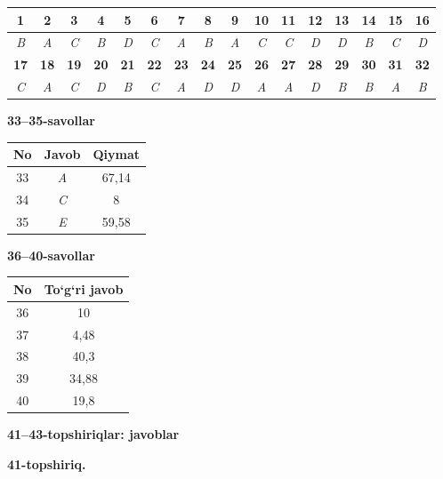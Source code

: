 \documentclass[11pt,a4paper]{article}
\begin{document}
\noindent\begin{tabular}{|c|c|c|c|c|c|c|c|c|c|c|c|c|c|c|c|}\hline
\textbf{1} & \textbf{2} & \textbf{3} & \textbf{4} & \textbf{5} & \textbf{6} & \textbf{7} & \textbf{8} & \textbf{9} & \textbf{10} & \textbf{11} & \textbf{12} & \textbf{13} & \textbf{14} & \textbf{15} & \textbf{16}\\\hline
\textsl{B} & \textsl{A} & \textsl{C} & \textsl{B} & \textsl{D} & \textsl{C} & \textsl{A} & \textsl{B} & \textsl{A} & \textsl{C} & \textsl{C} & \textsl{D} & \textsl{D} & \textsl{B} & \textsl{C} & \textsl{D}\\\hline
\textbf{17} & \textbf{18} & \textbf{19} & \textbf{20} & \textbf{21} & \textbf{22} & \textbf{23} & \textbf{24} & \textbf{25} & \textbf{26} & \textbf{27} & \textbf{28} & \textbf{29} & \textbf{30} & \textbf{31} & \textbf{32}\\\hline
\textsl{C} & \textsl{A} & \textsl{C} & \textsl{D} & \textsl{B} & \textsl{C} & \textsl{A} & \textsl{D} & \textsl{D} & \textsl{A} & \textsl{A} & \textsl{D} & \textsl{B} & \textsl{B} & \textsl{A} & \textsl{B}\\\hline
\end{tabular}\par\medskip
\noindent\textbf{33--35-savollar}\par\smallskip
\noindent\begin{tabular}{|c|c|c|}\hline \textbf{No} & \textbf{Javob} & \textbf{Qiymat}\\\hline
33 & \textsl{A} & 67,14\\\hline
34 & \textsl{C} & 8\\\hline
35 & \textsl{E} & 59,58\\\hline
\end{tabular}\par\medskip
\noindent\textbf{36--40-savollar}\par\smallskip
\noindent\begin{tabular}{|c|c|}\hline \textbf{No} & \textbf{To`g`ri javob}\\\hline
36 & 10\\\hline
37 & 4,48\\\hline
38 & 40,3\\\hline
39 & 34,88\\\hline
40 & 19,8\\\hline
\end{tabular}\par\medskip
\noindent\textbf{41--43-topshiriqlar: javoblar}\par\smallskip
\noindent\textbf{41-topshiriq.}\par
\end{document}
